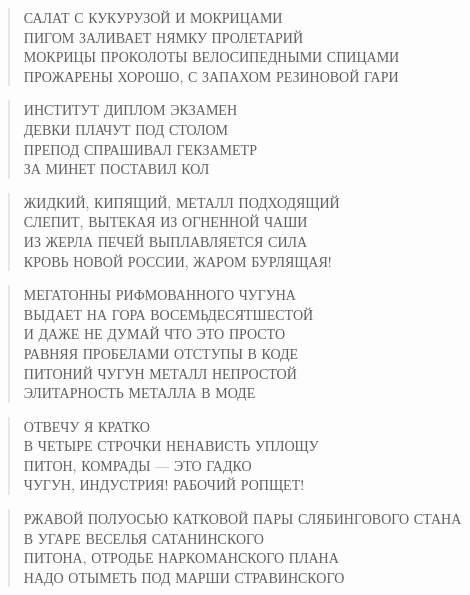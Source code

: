 \poemtitle{***}
\begin{verse}
САЛАТ С КУКУРУЗОЙ И МОКРИЦАМИ\\
ПИГОМ ЗАЛИВАЕТ НЯМКУ ПРОЛЕТАРИЙ\\
МОКРИЦЫ ПРОКОЛОТЫ ВЕЛОСИПЕДНЫМИ СПИЦАМИ\\
ПРОЖАРЕНЫ ХОРОШО, С ЗАПАХОМ РЕЗИНОВОЙ ГАРИ
\end{verse}

\poemtitle{***}
\begin{verse}
ИНСТИТУТ ДИПЛОМ ЭКЗАМЕН\\
ДЕВКИ ПЛАЧУТ ПОД СТОЛОМ\\
ПРЕПОД СПРАШИВАЛ ГЕКЗАМЕТР\\
ЗА МИНЕТ ПОСТАВИЛ КОЛ
\end{verse}

\poemtitle{***}
\begin{verse}
ЖИДКИЙ, КИПЯЩИЙ, МЕТАЛЛ ПОДХОДЯЩИЙ\\
СЛЕПИТ, ВЫТЕКАЯ ИЗ ОГНЕННОЙ ЧАШИ\\
ИЗ ЖЕРЛА ПЕЧЕЙ ВЫПЛАВЛЯЕТСЯ СИЛА\\
КРОВЬ НОВОЙ РОССИИ, ЖАРОМ БУРЛЯЩАЯ!
\end{verse}

\poemtitle{***}
\begin{verse}
МЕГАТОННЫ РИФМОВАННОГО ЧУГУНА\\
ВЫДАЕТ НА ГОРА ВОСЕМЬДЕСЯТШЕСТОЙ\\
И ДАЖЕ НЕ ДУМАЙ ЧТО ЭТО ПРОСТО\\
РАВНЯЯ ПРОБЕЛАМИ ОТСТУПЫ В КОДЕ\\
ПИТОНИЙ ЧУГУН МЕТАЛЛ НЕПРОСТОЙ\\
ЭЛИТАРНОСТЬ МЕТАЛЛА В МОДЕ
\end{verse}

\poemtitle{***}
\begin{verse}
ОТВЕЧУ Я КРАТКО\\
В ЧЕТЫРЕ СТРОЧКИ НЕНАВИСТЬ УПЛОЩУ\\
ПИТОН, КОМРАДЫ — ЭТО ГАДКО\\
ЧУГУН, ИНДУСТРИЯ! РАБОЧИЙ РОПЩЕТ!
\end{verse}

\poemtitle{***}
\begin{verse}
РЖАВОЙ ПОЛУОСЬЮ КАТКОВОЙ ПАРЫ СЛЯБИНГОВОГО СТАНА\\
В УГАРЕ ВЕСЕЛЬЯ САТАНИНСКОГО\\
ПИТОНА, ОТРОДЬЕ НАРКОМАНСКОГО ПЛАНА\\
НАДО ОТЫМЕТЬ ПОД МАРШИ СТРАВИНСКОГО
\end{verse}

